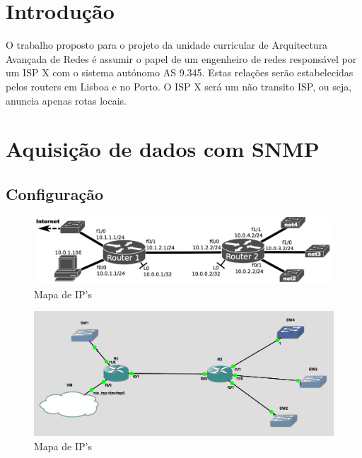 \documentclass[pdftex,12pt,a4paper]{report}
\begin{document}
\renewcommand{\headrulewidth}{0pt}

\fancyhead{}
\fancyfoot{}
\rfoot{\thepage}

\renewcommand*\contentsname{Conteúdos}
\renewcommand*\figurename{Figura}
\renewcommand*\tablename{Tabela}

\tableofcontents
\renewcommand{\headrulewidth}{0.15pt}
\renewcommand{\thechapter}{}

\clearpage

\section{Introdução}
O trabalho proposto para o projeto da unidade curricular de Arquitectura Avançada de Redes é assumir o papel de um engenheiro de redes responsável por um ISP X com o sistema autónomo AS 9.345.
Estas relações serão estabelecidas pelos routers em Lisboa e no Porto.  O ISP X será um não transito ISP, ou seja, anuncia apenas rotas locais.

\clearpage

\section{Aquisição de dados com SNMP}

\subsection{Configuração}
\begin{figure}[!htb]
\center
 \includegraphics[width=150mm,scale=1]{imagens/mapa.png}
 \caption{Mapa de IP's}
 \label{fig:mapadeips}
\end{figure}

\begin{figure}[!htb]
\center
 \includegraphics[width=150mm,scale=1]{imagens/gns_image.png}
 \caption{Mapa de IP's}
 \label{fig:mapadeips}
\end{figure}
\end{document}
